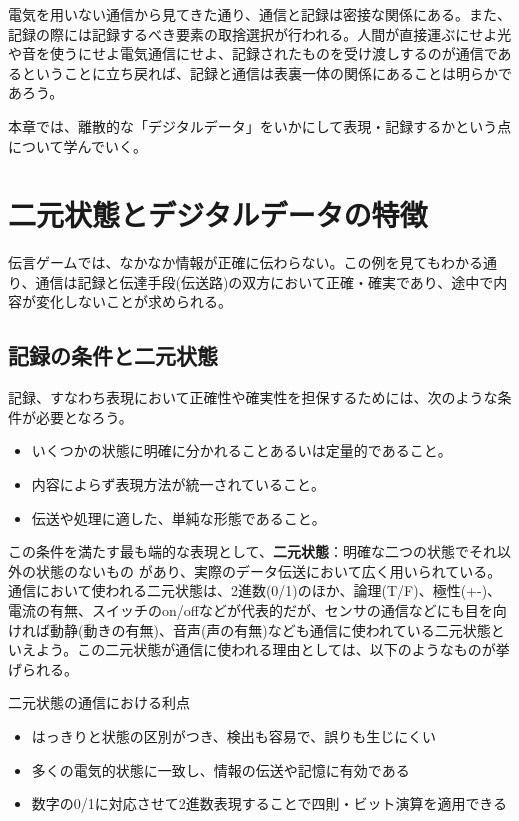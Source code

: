 電気を用いない通信から見てきた通り、通信と記録は密接な関係にある。また、記録の際には記録するべき要素の取捨選択が行われる。人間が直接運ぶにせよ光や音を使うにせよ電気通信にせよ、記録されたものを受け渡しするのが通信であるということに立ち戻れば、記録と通信は表裏一体の関係にあることは明らかであろう。

本章では、離散的な「デジタルデータ」をいかにして表現・記録するかという点について学んでいく。


\section{二元状態とデジタルデータの特徴}

伝言ゲームでは、なかなか情報が正確に伝わらない。この例を見てもわかる通り、通信は記録と伝達手段(伝送路)の双方において正確・確実であり、途中で内容が変化しないことが求められる。

\subsection{記録の条件と二元状態}
記録、すなわち表現において正確性や確実性を担保するためには、次のような条件が必要となろう。
\begin{itemize}
\item いくつかの状態に明確に分かれることあるいは定量的であること。
\item 内容によらず表現方法が統一されていること。
\item 伝送や処理に適した、単純な形態であること。
\end{itemize}

この条件を満たす最も端的な表現として、\textbf{二元状態}：明確な二つの状態でそれ以外の状態のないもの があり、実際のデータ伝送において広く用いられている。通信において使われる二元状態は、2進数(0/1)のほか、論理(T/F)、極性(+-)、電流の有無、スイッチのon/offなどが代表的だが、センサの通信などにも目を向ければ動静(動きの有無)、音声(声の有無)なども通信に使われている二元状態といえよう。この二元状態が通信に使われる理由としては、以下のようなものが挙げられる。
\begin{itembox}[l]{二元状態の通信における利点}
\begin{itemize}
\item はっきりと状態の区別がつき、検出も容易で、誤りも生じにくい
\item 多くの電気的状態に一致し、情報の伝送や記憶に有効である
\item 数字の0/1に対応させて2進数表現することで四則・ビット演算を適用できる
\end{itemize}
\end{itembox}

